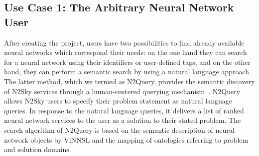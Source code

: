 \documentclass[conference]{IEEEtran}
\begin{document}
\subsection{Use Case 1: The Arbitrary Neural Network User}

After creating the project, users have two possibilities to find already available neural networks which correspond their needs: on the one hand they can search for a neural network using their identifiers or user-defined tags, and on the other hand, they can perform a semantic search by using a natural language approach.
The latter method, which we termed as N2Query, provides the semantic discovery of N2Sky services through
a human-centered querying mechanism~\cite{schikuta2016framework}. N2Query allows
N2Sky users to specify their problem statement as natural language
queries. In response to the natural language queries, it delivers a list of
ranked neural network services to the user as a solution to their stated
problem. The search algorithm of N2Query is based on the semantic description of neural network objects by ViNNSL and the mapping of ontologies referring to problem and solution domains.
\end{document}
